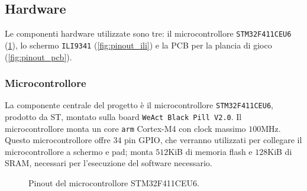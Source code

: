 \documentclass[12pt]{article}
\begin{document}
\subsection{Hardware}
%				
%				
%				
Le componenti hardware utilizzate sono tre: il microcontrollore
\texttt{STM32F411CEU6} (\cref{fig:pinout_stm32}), lo schermo \texttt{ILI9341}
(\cref{fig:pinout_ili}) e la PCB per la plancia di gioco
(\cref{fig:pinout_pcb}).

\subsubsection{Microcontrollore}
La componente centrale del progetto è il microcontrollore
\texttt{STM32F411CEU6}, prodotto da ST, montato sulla board \texttt{WeAct Black
	Pill V2.0}. Il microcontrollore monta un core \texttt{arm} Cortex-M4 con clock
massimo $100$MHz. Questo microcontrollore offre $34$ pin GPIO, che verranno
utilizzati per collegare il microcontrollore a schermo e pad; monta $512$KiB di
memoria flash e $128$KiB di SRAM, necessari per l'esecuzione del software
necessario.
\begin{figure}
	\begin{center}
		\begin{tikzpicture}[x=0.015cm, y=0.015cm, scale=0.5, transform shape]
			
		\end{tikzpicture}
	\end{center}
	\caption{Pinout del microcontrollore STM32F411CEU6.}
	\label{fig:pinout_stm32}

\end{figure}
\end{document}

